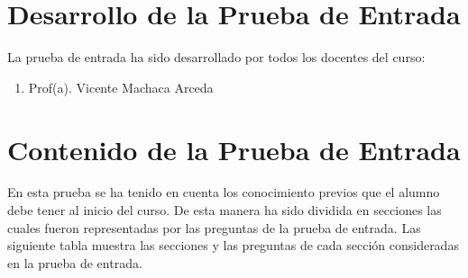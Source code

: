 \documentclass[11pt,fleqn]{book} %
\begin{document}
\setcounter{chapter}{1}

\begingroup
\thispagestyle{empty} %
\vfill
\endgroup

\let\cleardoublepage\clearpage

\newpage



\pagestyle{empty} %

\section{Desarrollo de la Prueba de Entrada}
La prueba de entrada ha sido desarrollado por todos los docentes del curso:
\begin{enumerate}
\item Prof(a). Vicente Machaca Arceda
\end{enumerate}


\section{Contenido de la Prueba de Entrada}
En esta prueba se ha tenido en cuenta los conocimiento previos que el alumno debe tener al inicio del curso. De esta manera ha sido dividida en secciones las cuales fueron representadas por las preguntas de la prueba de entrada. Las siguiente tabla muestra las secciones y las preguntas de cada sección consideradas en la prueba de entrada.
\end{document}
